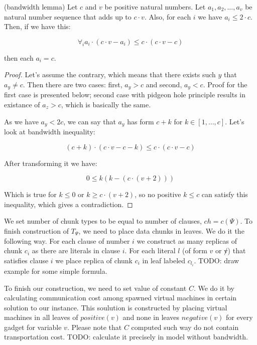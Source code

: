 \begin{lemma} (bandwidth lemma)
Let $c$ and $v$ be positive natural numbers. Let $a_1, a_2, \ldots,
a_v$ be natural number sequence that adds up to $c \cdot v$. Also, for
each $i$ we have $a_i \leq 2 \cdot c$. Then, if we have this:

$$ \forall_i a_i \cdot (c \cdot v - a_i) \leq c \cdot (c \cdot v -
c) $$

then each $a_i = c$.
\end{lemma}
\begin{proof}

Let's assume the contrary, which means that there exists such $y$ that
$a_y \neq c$. Then there are two cases: first, $a_y>c$ and second,
$a_y<c$. Proof for the first case is presented below; second case
with pidgeon hole principle results in existance of $a_z > c$, which
is basically the same.

As we have $a_y < 2c$, we can say that $a_y$ has form $c +
k$ for $k \in [1, \ldots, c]$. Let's look at bandwidth inequality:

$$ (c + k) \cdot (c \cdot v - c - k) \leq c \cdot (c \cdot v - c) $$

After transforming it we have:

$$ 0 \leq k(k - (c \cdot (v + 2))) $$

Which is true for $k \leq 0$ or $k \geq c \cdot (v + 2)$, so no
positive $k \leq c$ can satisfy this inequality, which gives a contradiction. 

\end{proof}

We set number of chunk types to be equal to number of clauses, $ch =
c(\Psi)$. To finish construction of $T_{\Psi}$, we need to place data chunks in
leaves. We do it the following way. For each clause of number $i$ we
construct as many replicas of chunk $c_i$ as there are literals in
clause $i$. For each literal $l$ (of form $v$ or $\not v$) that satisfies clause $i$ we place
replica of chunk $c_i$ in leaf labeled $c_{l_i}$. TODO: draw example for
some simple formula.

To finish our construction, we need to set value of constant $C$. We
do it by calculating communication cost among spawned virtual machines in
certain solution to our instance. This soulution is constructed by placing
virtual machines in all leaves of $positive(v)$ and none in leaves
$negative(v)$ for every gadget for variable $v$. Please note that $C$
computed such way do not contain transportation cost. TODO: calculate
it precisely in model without bandwidth.

